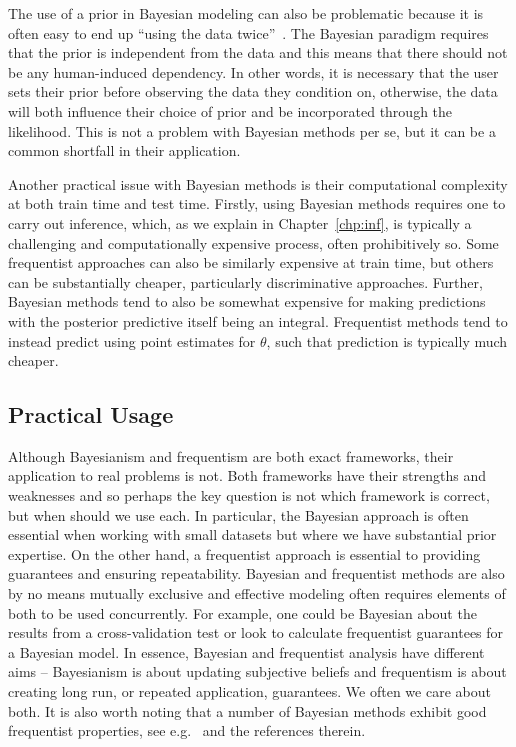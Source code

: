 The use of a prior in Bayesian modeling can also be problematic because it is often easy to end up 
``using the data twice''~\citep{gelman2008objections}.  The Bayesian paradigm requires that the
prior is independent from the data and this means that there should not be any human-induced
dependency.  In other words, it is necessary that the user sets their prior before
observing the data they condition on, otherwise, the data will both influence their choice of prior
and be incorporated through the likelihood.  This is not a problem with Bayesian 
methods per se, but it can be a common shortfall in their application.

Another practical issue with Bayesian methods is their computational complexity at both
train time and test time.  Firstly, using Bayesian methods requires one to carry out inference,
which, as we explain in Chapter~\ref{chp:inf}, is typically a challenging and computationally
expensive process, often prohibitively so.  Some frequentist approaches can also
be similarly expensive at train time, but others can be substantially cheaper, particularly
discriminative approaches.  Further, Bayesian methods tend to also be somewhat expensive
for making predictions with the posterior predictive itself being an integral.  Frequentist
methods tend to instead predict using point estimates for $\theta$, such that prediction is typically
much cheaper.

\subsection{Practical Usage}
\label{sec:bayes:religion:correct}

Although Bayesianism and frequentism are both exact frameworks, their application to real problems is not.
Both frameworks have their strengths and weaknesses and so perhaps the key question is not which framework
is correct, but when should we use each.  In
particular, the Bayesian approach is often essential when working with small datasets but where we have substantial
prior expertise.  On the other hand, a frequentist approach is essential to providing guarantees and ensuring repeatability.  
Bayesian and frequentist methods are also by no means mutually 
exclusive and effective modeling often requires elements of both
to be used concurrently.  
For example, one could be Bayesian about the results from a cross-validation test or look to calculate
frequentist guarantees for a Bayesian model.
In essence, Bayesian and frequentist analysis have different aims -- Bayesianism is about updating
subjective beliefs and frequentism is about creating long run, or repeated application, guarantees.
We often we care about both.  It is also worth noting that a number of Bayesian methods exhibit
good frequentist properties, see e.g.~\cite{mcallester2013pac} and the references therein.

